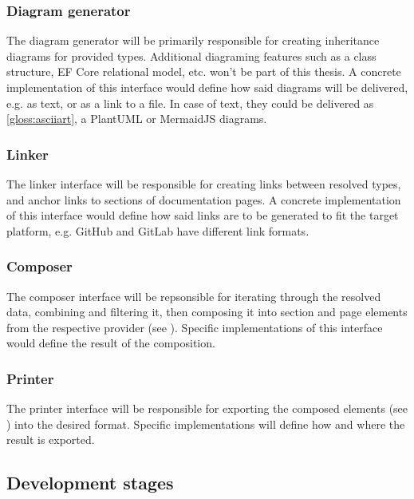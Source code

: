 \subsubsection{Diagram generator}

The diagram generator will be primarily responsible for creating inheritance diagrams for provided types. Additional diagraming features such as a class structure, EF Core relational model, etc. won't be part of this thesis.
A concrete implementation of this interface would define how said diagrams will be delivered, e.g. as text, or as a link to a file.
In case of text, they could be delivered as \ref{gloss:asciiart}, a PlantUML or MermaidJS diagrams.

\subsubsection{Linker}

The linker interface will be responsible for creating links between resolved types, and anchor links to sections of documentation pages.
A concrete implementation of this interface would define how said links are to be generated to fit the target platform, e.g. GitHub and GitLab have different link formats.

\subsubsection{Composer} \label{sec:composer}

The composer interface will be repsonsible for iterating through the resolved data, combining and filtering it, then composing it into section and page elements from the respective provider (see ).
Specific implementations of this interface would define the result of the composition.

\subsubsection{Printer}

The printer interface will be responsible for exporting the composed elements (see ) into the desired format.
Specific implementations will define how and where the result is exported.

\subsection{Development stages}

